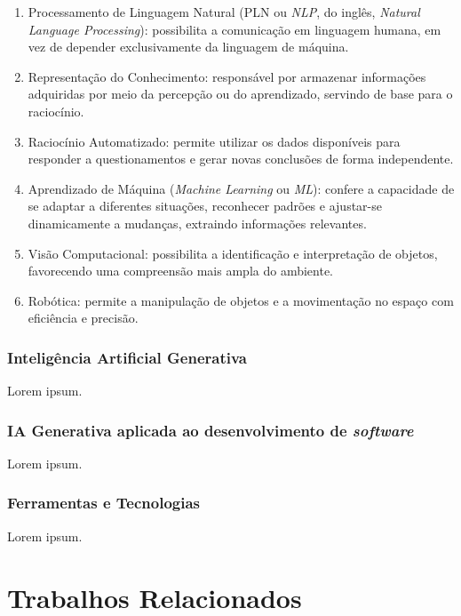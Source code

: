 \documentclass[english,brazilian]{UNISINOSartigo} %
\begin{document}
\begin{enumerate}[leftmargin=1cm, itemsep=0.1em, topsep=0.1em]
    \item Processamento de Linguagem Natural (PLN ou \textit{NLP}, do inglês, \textit{Natural Language Processing}): possibilita a comunicação em linguagem humana, em vez de depender exclusivamente da linguagem de máquina.
    \item Representação do Conhecimento: responsável por armazenar informações adquiridas por meio da percepção ou do aprendizado, servindo de base para o raciocínio.
    \item Raciocínio Automatizado: permite utilizar os dados disponíveis para responder a questionamentos e gerar novas conclusões de forma independente.
    \item Aprendizado de Máquina (\textit{Machine Learning} ou \textit{ML}): confere a capacidade de se adaptar a diferentes situações, reconhecer padrões e ajustar-se dinamicamente a mudanças, extraindo informações relevantes.
    \item Visão Computacional: possibilita a identificação e interpretação de objetos, favorecendo uma compreensão mais ampla do ambiente.
    \item Robótica: permite a manipulação de objetos e a movimentação no espaço com eficiência e precisão.
\end{enumerate}

\subsubsection{Inteligência Artificial Generativa}

Lorem ipsum.

\subsubsection{IA Generativa aplicada ao desenvolvimento de \textit{software}}

Lorem ipsum.

\subsubsection{Ferramentas e Tecnologias}

Lorem ipsum.

\section{Trabalhos Relacionados}
\end{document}
